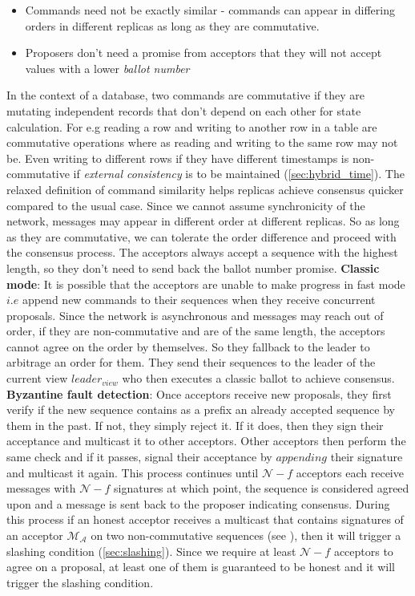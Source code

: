 \begin{itemize}
	\item Commands need not be exactly similar - commands can appear in differing orders in different replicas as long as they are commutative.
	\item Proposers don't need a promise from acceptors that they will not accept values with a lower \textit{ballot number} 
\end{itemize}
In the context of a database, two commands are commutative if they are mutating independent records that don't depend on each other for state calculation. For e.g reading a row and writing to another row in a table are commutative operations where as reading and writing to the same row may not be. Even writing to different rows if they have different timestamps is non-commutative if \textit{external consistency} is to be maintained (\cref{sec:hybrid_time}). The relaxed definition of command similarity helps replicas achieve consensus quicker compared to the usual case. Since we cannot assume synchronicity of the network, messages may appear in different order at different replicas. So as long as they are commutative, we can tolerate the order difference and proceed with the consensus process. The acceptors always accept a sequence with the highest length, so they don't need to send back the ballot number promise.
\newline\newline
\textbf{Classic mode}: It is possible that the acceptors are unable to make progress in fast mode $i.e$ append new commands to their sequences when they receive concurrent proposals. Since the network is asynchronous and messages may reach out of order, if they are non-commutative and are of the same length, the acceptors cannot agree on the order by themselves. So they fallback to the leader to arbitrage an order for them. They send their sequences to the leader of the current view $leader_{view}$ who then executes a classic ballot to achieve consensus.
\newline\newline
\textbf{Byzantine fault detection}: Once acceptors receive new proposals, they first verify if the new sequence contains as a prefix an already accepted sequence by them in the past. If not, they simply reject it. If it does, then they sign their acceptance and multicast it to other acceptors. Other acceptors then perform the same check and if it passes, signal their acceptance by $appending$ their signature and multicast it again. This process continues until $\mathcal{N} - f$ acceptors each receive messages with $\mathcal{N} - f$ signatures at which point, the sequence is considered agreed upon and a message is sent back to the proposer indicating consensus. During this process if an honest acceptor receives a multicast that contains signatures of an acceptor $\mathcal{M_A}$ on two non-commutative sequences (see ), then it will trigger a slashing condition (\cref{sec:slashing}). Since we require at least $\mathcal{N} - f$ acceptors to agree on a proposal, at least one of them is guaranteed to be honest and it will trigger the slashing condition. 
